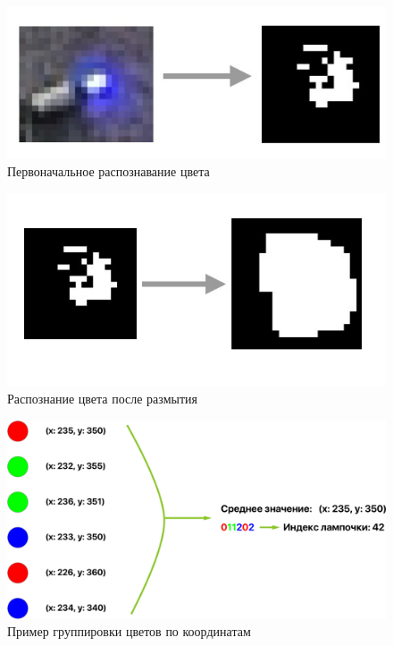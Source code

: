 ~
\begin{figure}[H]
\centering
	\includegraphics[scale=0.5]{figures/calibration/toBlackWhite.jpg}
	\caption{Первоначальное распознавание цвета}
	\label{fig:develop:algorithm:toBlackWhite}
\end{figure}

\begin{figure}[H]
\centering
	\includegraphics[scale=0.5]{figures/calibration/blurring.jpg}
	\caption{Распознание цвета после размытия}
	\label{fig:develop:algorithm:blurring}
\end{figure}

\begin{figure}[H]
\centering
	\includegraphics[scale=0.35]{figures/calibration/grouping.pdf}
	\caption{Пример группировки цветов по координатам}
	\label{fig:develop:algorithm:grouping}
\end{figure}

